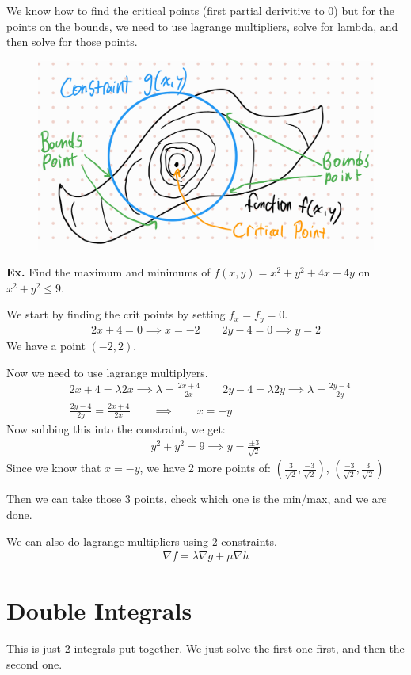\documentclass[12pt,letterpaper]{article} \usepackage{amsmath} \usepackage{graphicx} \usepackage[margin=1in]{geometry} \usepackage{longtable}  \usepackage{amssymb}
\begin{document}
	We know how to find the critical points (first partial derivitive to 0) but for the points on the bounds, we need to use lagrange multipliers, solve for lambda, and then solve for those points. 
	\begin{figure}[H]
		\centering
		\includegraphics[width=0.5\linewidth]{lagrange.png}
	\end{figure}

	\begin{mdframed}[]
		\textbf{Ex. } Find the maximum and minimums of $f(x,y) = x^2+y^2 +4x-4y$ on $x^2+y^2\le 9$.
		
		We start by finding the crit points by setting $f_x=f_y=0$.
		\begin{align*}
			2x+4=0 \implies x=-2 \qquad 2y-4 = 0 \implies y=2
		\end{align*}
		We have a point $(-2,2)$.
		
		Now we need to use lagrange multiplyers. 
		\begin{align*}
			& 2x+4 = \lambda 2x \implies \lambda = \frac{2x+4}{2x} \qquad 2y-4 = \lambda 2y \implies \lambda = \frac{2y-4}{2y}\\
			& \frac{2y-4}{2y} = \frac{2x+4}{2x} \qquad \implies \qquad x=-y
		\end{align*}
		Now subbing this into the constraint, we get:
		\begin{align*}
			y^2 + y^2 = 9 \implies y=\frac{\pm 3}{\sqrt{2}}
		\end{align*}
		Since we know that $x=-y$, we have 2 more points of: $\left(\frac{3}{\sqrt{2}},\frac{-3}{\sqrt{2}}\right)$, $\left(\frac{-3}{\sqrt{2}},\frac{3}{\sqrt{2}}\right)$
		
		Then we can take those 3 points, check which one is the min/max, and we are done.
	\end{mdframed}

	We can also do lagrange multipliers using 2 constraints.
	\begin{align*}
		\nabla f = \lambda \nabla g + \mu \nabla h
	\end{align*}
	
	\section{Double Integrals}
	This is just 2 integrals put together. We just solve the first one first, and then the second one. 
	
\end{document}
